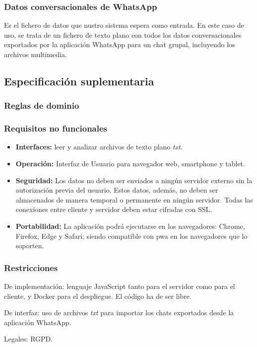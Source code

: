 \subsubsection{Datos conversacionales de WhatsApp}

Es el fichero de datos que nustro sistema espera como entrada. En este caso de uso, se trata de un fichero de texto plano con todos los datos conversacionales exportados por la aplicación WhatsApp para un chat grupal, incluyendo los archivos multimedia.

\subsection{Especificación suplementaria}
\label{subsect:suplementary-specification}

\subsubsection{Reglas de dominio}



\subsubsection{Requisitos no funcionales}

\begin{itemize}
	\item \textbf{Interfaces:} leer y analizar archivos de texto plano \textit{txt}. 
	
	\item \textbf{Operación:} Interfaz de Usuario para navegador web, smartphone y tablet.
	
	\item \textbf{Seguridad:} Los datos no deben ser enviados a ningún servidor externo sin la autorización previa del usuario. Estos datos, además, no deben ser almacenados de manera temporal o permanente en ningún servidor. Todas las conexiones entre cliente y servidor deben estar cifradas con SSL.
	
	\item \textbf{Portabilidad:} La aplicación podrá ejecutarse en los navegadores: Chrome, Firefox, Edge y Safari; siendo compatible con \acrshort{pwa} en los navegadores que lo soporten.
\end{itemize}

\subsubsection{Restricciones}
De implementación: lenguaje JavaScript tanto para el servidor como para el cliente, y Docker para el despliegue. El código ha de ser libre.

De interfaz: uso de archivos \textit{txt} para importar los chats exportados desde la aplicación WhatsApp. 

Legales: RGPD.